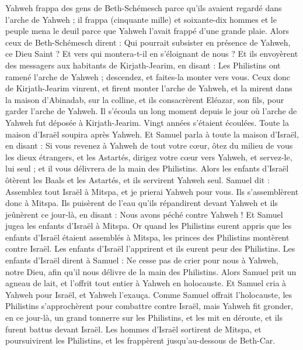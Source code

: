 \begin{multicols}{2}
Yahweh frappa des gens de Beth-Schémesch parce qu'ils avaient regardé dans l'arche de Yahweh ; il frappa (cinquante mille) et soixante-dix hommes et le peuple mena le deuil parce que Yahweh l'avait frappé d'une grande plaie.
Alors ceux de Beth-Schémesch dirent : Qui pourrait subsister en présence de Yahweh, ce Dieu Saint ? Et vers qui montera-t-il en s'éloignant de nous ?
Et ils envoyèrent des messagers aux habitants de Kirjath-Jearim, en disant : Les Philistins ont ramené l'arche de Yahweh ; descendez, et faites-la monter vers vous.
\VerseOne{}Ceux donc de Kirjath-Jearim vinrent, et firent monter l'arche de Yahweh, et la mirent dans la maison d'Abinadab, sur la colline, et ils consacrèrent Eléazar, son fils, pour garder l'arche de Yahweh.
Il s’écoula un long moment depuis le jour où l'arche de Yahweh fut déposée à Kirjath-Jearim. Vingt années s’étaient écoulées. Toute la maison d'Israël soupira après Yahweh.
Et Samuel parla à toute la maison d'Israël, en disant : Si vous revenez à Yahweh de tout votre cœur, ôtez du milieu de vous les dieux étrangers, et les Astartés, dirigez votre cœur vers Yahweh, et servez-le, lui seul ; et il vous délivrera de la main des Philistins.
Alors les enfants d'Israël ôtèrent les Baals et les Astartés, et ils servirent Yahweh seul.
Samuel dit : Assemblez tout Israël à Mitspa, et je prierai Yahweh pour vous.
Ils s'assemblèrent donc à Mitspa. Ils puisèrent de l'eau qu'ils répandirent devant Yahweh et ils jeûnèrent ce jour-là, en disant : Nous avons péché contre Yahweh ! Et Samuel jugea les enfants d'Israël à Mitspa.
Or quand les Philistins eurent appris que les enfants d'Israël étaient assemblés à Mitspa, les princes des Philistins montèrent contre Israël. Les enfants d'Israël l’apprirent et ils eurent peur des Philistins.
Les enfants d'Israël dirent à Samuel : Ne cesse pas de crier pour nous à Yahweh, notre Dieu, afin qu'il nous délivre de la main des Philistins.
Alors Samuel prit un agneau de lait, et l'offrit tout entier à Yahweh en holocauste. Et Samuel cria à Yahweh pour Israël, et Yahweh l'exauça.
Comme Samuel offrait l'holocauste, les Philistins s'approchèrent pour combattre contre Israël, mais Yahweh fit gronder, en ce jour-là, un grand tonnerre sur les Philistins, et les mit en déroute, et ils furent battus devant Israël.
Les hommes d'Israël sortirent de Mitspa, et poursuivirent les Philistins, et les frappèrent jusqu'au-dessous de Beth-Car.

\end{multicols}
